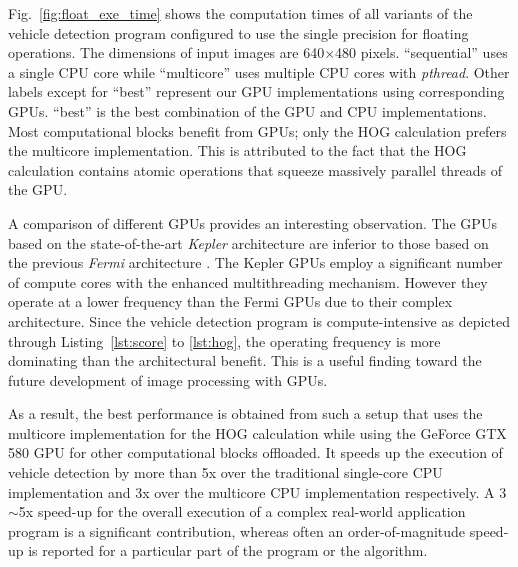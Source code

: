 Fig.~\ref{fig:float_exe_time} shows the computation times of all variants
of the vehicle detection program configured to use the single precision
for floating operations.
The dimensions of input images are 640$\times$480 pixels.
``sequential'' uses a single CPU core while ``multicore'' uses multiple
CPU cores with \textit{pthread}.
Other labels except for ``best'' represent our GPU implementations using
corresponding GPUs.
``best'' is the best combination of the GPU and CPU implementations.
Most computational blocks benefit from GPUs; only the HOG calculation
prefers the multicore implementation.
This is attributed to the fact that the HOG calculation contains atomic
operations that squeeze massively parallel threads of the GPU.

A comparison of different GPUs provides an interesting observation.
The GPUs based on the state-of-the-art \textit{Kepler}
architecture \cite{NVIDIA_Kepler} are inferior to those based on the
previous \textit{Fermi} architecture \cite{NVIDIA_Fermi}.
The Kepler GPUs employ a significant number of compute cores with the
enhanced multithreading mechanism.
However they operate at a lower frequency than the Fermi GPUs due to
their complex architecture.
Since the vehicle detection program is compute-intensive as depicted
through Listing~\ref{lst:score} to \ref{lst:hog}, the operating 
frequency is more dominating than the architectural benefit.
This is a useful finding toward the future development of image
processing with GPUs.

As a result, the best performance is obtained from such a setup that
uses the multicore implementation for the HOG calculation while using
the GeForce GTX 580 GPU for other computational blocks offloaded.
It speeds up the execution of vehicle detection by more than 5x over the
traditional single-core CPU implementation and 3x over the multicore CPU
implementation respectively. 
A 3$\sim$5x speed-up for the overall execution of a complex real-world
application program is a significant contribution, whereas often an
order-of-magnitude speed-up is reported for a particular part of the
program or the algorithm.

